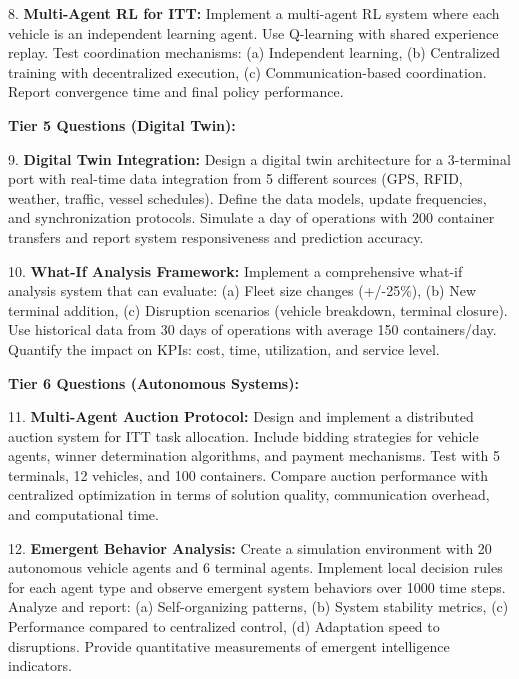 \documentclass{article}
\begin{document}
8. \textbf{Multi-Agent RL for ITT:} Implement a multi-agent RL system where each vehicle is an independent learning agent. Use Q-learning with shared experience replay. Test coordination mechanisms: (a) Independent learning, (b) Centralized training with decentralized execution, (c) Communication-based coordination. Report convergence time and final policy performance.

\textbf{Tier 5 Questions (Digital Twin):}

9. \textbf{Digital Twin Integration:} Design a digital twin architecture for a 3-terminal port with real-time data integration from 5 different sources (GPS, RFID, weather, traffic, vessel schedules). Define the data models, update frequencies, and synchronization protocols. Simulate a day of operations with 200 container transfers and report system responsiveness and prediction accuracy.

10. \textbf{What-If Analysis Framework:} Implement a comprehensive what-if analysis system that can evaluate: (a) Fleet size changes (+/-25\%), (b) New terminal addition, (c) Disruption scenarios (vehicle breakdown, terminal closure). Use historical data from 30 days of operations with average 150 containers/day. Quantify the impact on KPIs: cost, time, utilization, and service level.

\textbf{Tier 6 Questions (Autonomous Systems):}

11. \textbf{Multi-Agent Auction Protocol:} Design and implement a distributed auction system for ITT task allocation. Include bidding strategies for vehicle agents, winner determination algorithms, and payment mechanisms. Test with 5 terminals, 12 vehicles, and 100 containers. Compare auction performance with centralized optimization in terms of solution quality, communication overhead, and computational time.

12. \textbf{Emergent Behavior Analysis:} Create a simulation environment with 20 autonomous vehicle agents and 6 terminal agents. Implement local decision rules for each agent type and observe emergent system behaviors over 1000 time steps. Analyze and report: (a) Self-organizing patterns, (b) System stability metrics, (c) Performance compared to centralized control, (d) Adaptation speed to disruptions. Provide quantitative measurements of emergent intelligence indicators.
\end{document}
